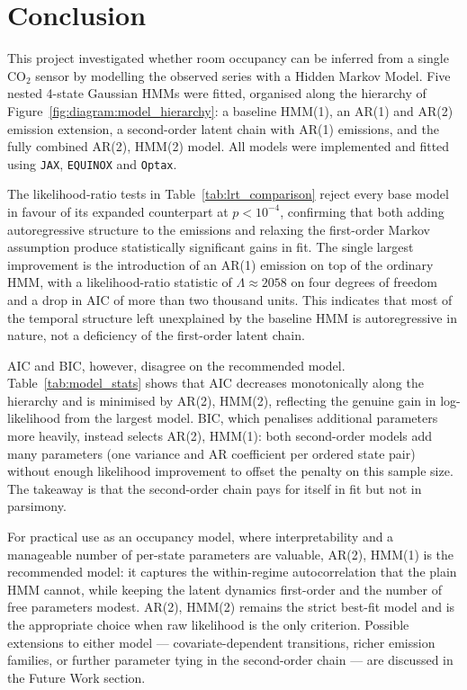 \section{Conclusion}

This project investigated whether room occupancy can be inferred from a single
$\text{CO}_2$ sensor by modelling the observed series with a Hidden Markov
Model. Five nested 4-state Gaussian HMMs were fitted, organised along the
hierarchy of Figure~\ref{fig:diagram:model_hierarchy}: a baseline HMM(1), an
AR(1) and AR(2) emission extension, a second-order latent chain with AR(1)
emissions, and the fully combined AR(2), HMM(2) model. All models were
implemented and fitted using \texttt{JAX}, \texttt{EQUINOX} and \texttt{Optax}.

The likelihood-ratio tests in
Table~\ref{tab:lrt_comparison} reject every base model in favour of its
expanded counterpart at $p < 10^{-4}$, confirming that both adding
autoregressive structure to the emissions and relaxing the first-order Markov
assumption produce statistically significant gains in fit. The single largest
improvement is the introduction of an AR(1) emission on top of the ordinary
HMM, with a likelihood-ratio statistic of $\Lambda \approx 2058$ on four
degrees of freedom and a drop in AIC of more than two thousand units. This
indicates that most of the temporal structure left unexplained by the
baseline HMM is autoregressive in nature, not a deficiency of the
first-order latent chain.

AIC and BIC, however, disagree on the recommended model.
Table~\ref{tab:model_stats} shows that AIC decreases monotonically along the
hierarchy and is minimised by AR(2), HMM(2), reflecting the genuine gain in
log-likelihood from the largest model. BIC, which penalises additional
parameters more heavily, instead selects AR(2), HMM(1): both second-order
models add many parameters (one variance and AR coefficient per ordered
state pair) without enough likelihood improvement to offset the penalty on
this sample size. The takeaway is that the second-order chain pays for
itself in fit but not in parsimony.

For practical use as an occupancy model, where interpretability and a
manageable number of per-state parameters are valuable, AR(2), HMM(1) is the
recommended model: it captures the within-regime autocorrelation that the
plain HMM cannot, while keeping the latent dynamics first-order and the
number of free parameters modest. AR(2), HMM(2) remains the strict best-fit
model and is the appropriate choice when raw likelihood is the only
criterion. Possible extensions to either model --- covariate-dependent
transitions, richer emission families, or further parameter tying in the
second-order chain --- are discussed in the Future Work section.
